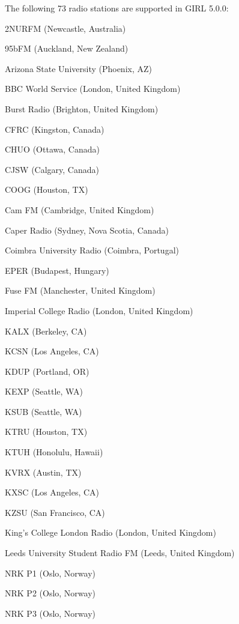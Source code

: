 \documentclass[20pt,landscape]{foils}
\begin{document}

The following 73 radio stations are supported in GIRL 5.0.0:

\begin{list1}
\item
  \begin{list2}
  \item 2NURFM (Newcastle, Australia)
  \item 95bFM (Auckland, New Zealand)
  \item Arizona State University (Phoenix, AZ)
  \item BBC World Service (London, United Kingdom)
  \item Burst Radio (Brighton, United Kingdom)
  \item CFRC (Kingston, Canada)
  \item CHUO (Ottawa, Canada)
  \item CJSW (Calgary, Canada)
  \item COOG (Houston, TX)
  \item Cam FM (Cambridge, United Kingdom)
  \item Caper Radio (Sydney, Nova Scotia, Canada)
  \item Coimbra University Radio (Coimbra, Portugal)
  \item EPER (Budapest, Hungary)
  \item Fuse FM (Manchester, United Kingdom)
  \item Imperial College Radio (London, United Kingdom)
  \item KALX (Berkeley, CA)
  \item KCSN (Los Angeles, CA)
  \item KDUP (Portland, OR)
  \item KEXP (Seattle, WA)
  \item KSUB (Seattle, WA)
  \item KTRU (Houston, TX)
  \item KTUH (Honolulu, Hawaii)
  \item KVRX (Austin, TX)
  \item KXSC (Los Angeles, CA)
  \item KZSU (San Francisco, CA)
  \item King's College London Radio (London, United Kingdom)
  \item Leeds University Student Radio FM (Leeds, United Kingdom)
  \item NRK P1 (Oslo, Norway)
  \item NRK P2 (Oslo, Norway)
  \item NRK P3 (Oslo, Norway)

\end{list2}
\end{list1}
\end{document}
